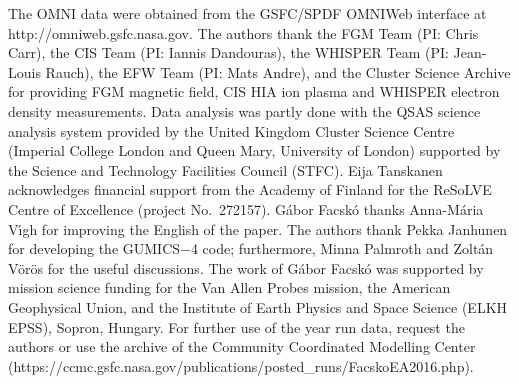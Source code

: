 \documentclass[draft]{agujournal2019}
\begin{document}
\acknowledgments
The OMNI data were obtained from the GSFC/SPDF OMNIWeb interface at http://omniweb.gsfc.nasa.gov. The authors thank the FGM Team (PI: Chris Carr), the CIS Team (PI: Iannis Dandouras), the WHISPER Team (PI: Jean-Louis Rauch), the EFW Team (PI: Mats Andre), and the Cluster Science Archive for providing FGM magnetic field, CIS HIA ion plasma and WHISPER electron density measurements. Data analysis was partly done with the QSAS science analysis system provided by the United Kingdom Cluster Science Centre (Imperial College London and Queen Mary, University of London) supported by the Science and Technology Facilities Council (STFC). Eija Tanskanen acknowledges financial support from the Academy of Finland for the ReSoLVE Centre of Excellence (project No.~272157). G{\'a}bor Facsk{\'o} thanks Anna-M\'aria V{\'\i{}}gh for improving the English of the paper. The authors thank Pekka Janhunen for developing the GUMICS$-$4 code; furthermore, Minna Palmroth and Zolt{\'a}n V{\"o}r{\"o}s for the useful discussions. The work of G{\'a}bor Facsk{\'o} was supported by mission science funding for the Van Allen Probes mission, the American Geophysical Union, and the Institute of Earth Physics and Space Science (ELKH EPSS), Sopron, Hungary. For further use of the year run data, request the authors or use the archive of the Community Coordinated Modelling Center (https://ccmc.gsfc.nasa.gov/publications/posted\_runs/FacskoEA2016.php).





\pagebreak
\end{document}
